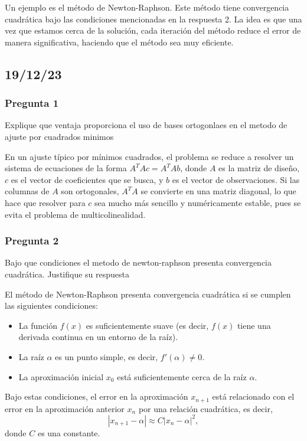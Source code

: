 Un ejemplo es el método de Newton-Raphson. Este método tiene convergencia cuadrática bajo las condiciones mencionadas en la respuesta 2. La idea es que una vez que estamos cerca de la solución, cada iteración del método reduce el error de manera significativa, haciendo que el método sea muy eficiente.


\subsection{19/12/23}
\subsubsection{Pregunta 1}
Explique que ventaja proporciona el uso de bases ortogonlaes en el metodo de ajuste por cuadrados minimos

En un ajuste típico por mínimos cuadrados, el problema se reduce a resolver un sistema de ecuaciones de la forma $A^TAc = A^TAb $, donde $A$ es la matriz de diseño, $c$ es el vector de coeficientes que se busca, y $b$ es el vector de observaciones. Si las columnas de $A$ son ortogonales, $A^TA$ se convierte en una matriz diagonal, lo que hace que resolver para $c$ sea mucho más sencillo y numéricamente estable, pues se evita el problema de multicolinealidad.

\subsubsection{Pregunta 2}
Bajo que condiciones el metodo de newton-raphson presenta convergencia cuadrática. Justifique su respuesta

El método de Newton-Raphson presenta convergencia cuadrática si se cumplen las siguientes condiciones:
\begin{itemize}
\item La función \( f(x) \) es suficientemente suave (es decir, \( f(x) \) tiene una derivada continua en un entorno de la raíz).
\item La raíz \( \alpha \) es un punto simple, es decir, \( f'(\alpha) \neq 0 \).
\item La aproximación inicial \( x_0 \) está suficientemente cerca de la raíz \( \alpha \).
\end{itemize}

Bajo estas condiciones, el error en la aproximación \( x_{n+1} \) está relacionado con el error en la aproximación anterior \( x_n \) por una relación cuadrática, es decir, 
\[ 
|x_{n+1} - \alpha| \approx C|x_n - \alpha|^2,
\]
donde \( C \) es una constante.